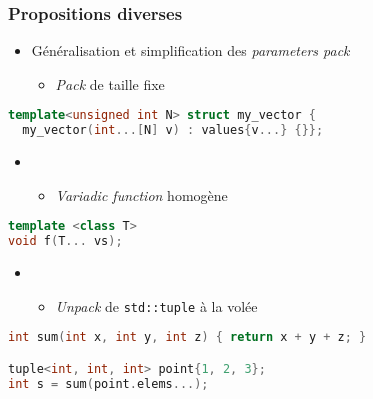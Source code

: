 \documentclass[C++.tex]{subfiles}
\begin{document}
\begin{frame}[fragile]
	\frametitle{Propositions diverses}
	\begin{itemize}
		\item Généralisation et simplification des \textit{parameters pack}
		\begin{itemize}
			\item \textit{Pack} de taille fixe
		\end{itemize}
	\end{itemize}

	\begin{lstlisting}[language=C++]
template<unsigned int N> struct my_vector {
  my_vector(int...[N] v) : values{v...} {}};\end{lstlisting}

	\begin{itemize}
		\item [] \begin{itemize}
			\item \textit{Variadic function} homogène
		\end{itemize}
	\end{itemize}

	\begin{lstlisting}[language=C++]
template <class T>
void f(T... vs);\end{lstlisting}


	\begin{itemize}
		\item [] \begin{itemize}
			\item \og \textit{Unpack}\fg{} de \lstinline|std::tuple| à la volée
		\end{itemize}
	\end{itemize}

	\begin{lstlisting}[language=C++]
int sum(int x, int y, int z) { return x + y + z; }

tuple<int, int, int> point{1, 2, 3};
int s = sum(point.elems...);\end{lstlisting}
\end{frame}
\end{document}
